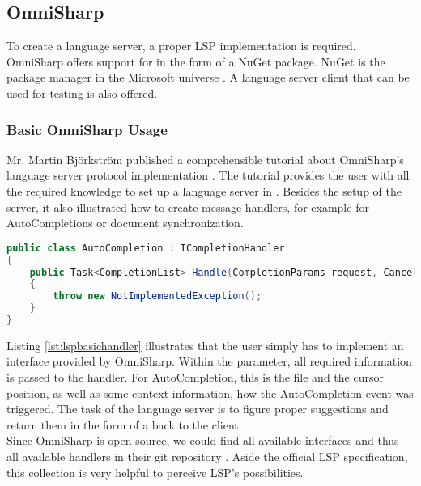\subsection{OmniSharp}
\label{section:analysis:omnisharp}
To create a language server, a proper LSP implementation is required.
OmniSharp offers support for \CsharpWithSpace \cite{langserverdotorg} in the form of a NuGet package. 
NuGet is the package manager in the Microsoft universe \cite{nuget}.
A language server client that can be used for testing is also offered.

\subsubsection{Basic OmniSharp Usage}
Mr. Martin Bj\"orkstr\"om published a comprehensible tutorial about OmniSharp's language server protocol implementation \cite{omnisharptutorial}.
The tutorial provides the user with all the required knowledge to set up a language server in \Csharp.
Besides the setup of the server, it also illustrated how to create message handlers, for example for AutoCompletions or document synchronization.\\

\begin{lstlisting}[language=csharp, caption={LSP Handler Implementation}, captionpos=b, label={lst:lspbasichandler}]
public class AutoCompletion : ICompletionHandler
{
    public Task<CompletionList> Handle(CompletionParams request, CancellationToken cancellationToken)
    {
        throw new NotImplementedException();
    }
}
\end{lstlisting}

Listing \ref{lst:lspbasichandler} illustrates that the user simply has to implement an interface provided by OmniSharp.
Within the  parameter, all required information is passed to the handler.
For AutoCompletion, this is the file and the cursor position, as well as some context information, how the AutoCompletion event was triggered.
The task of the language server is to figure proper suggestions and return them in the form of a  back to the client.\\

Since OmniSharp is open source, we could find all available interfaces and thus all available handlers in their git repository \cite{omnisharpgit}.
Aside the official LSP specification, this collection is very helpful to perceive LSP's possibilities.

